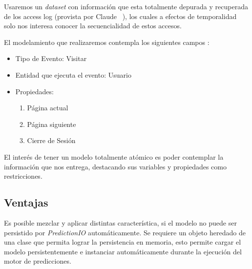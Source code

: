  Usaremos un \emph{dataset} con información que esta totalmente depurada y recuperada de los access log (provista por Claude \etal~\cite{Claude2014}), los cuales a efectos de temporalidad solo nos interesa conocer la secuencialidad de estos accesos.
  



  El modelamiento que realizaremos contempla los siguientes campos :

    \begin{itemize}
    		\setlength{\itemsep}{1pt}
    		\setlength{\parskip}{0pt}
    		\setlength{\parsep}{0pt}
      \item Tipo de Evento: Visitar
      \item Entidad que ejecuta el evento: Usuario
      \item Propiedades:
          \begin{enumerate}
          		\setlength{\itemsep}{1pt}
          		\setlength{\parskip}{0pt}
          		\setlength{\parsep}{0pt}
            \item Página actual
            \item Página siguiente
            \item Cierre de Sesión
          \end{enumerate}
    \end{itemize}



    El interés de tener un modelo totalmente atómico es poder contemplar la información que nos entrega, destacando sus variables y propiedades como restricciones.



\subsection{Ventajas }


  Es posible mezclar y aplicar distintas característica, si el modelo no puede ser persistido por \emph{PredictionIO} automáticamente. Se requiere un objeto  heredado de una clase que permita lograr la persistencia en memoria, esto permite cargar el modelo persistentemente e instanciar automáticamente durante la ejecución del motor de predicciones.



